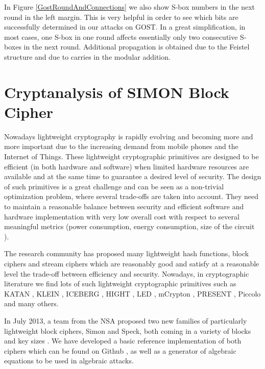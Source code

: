 In Figure \ref{GostRoundAndConnections}
we also show S-box numbers
in the next round in the left margin.
This is very helpful in order to see which bits are successfully determined in our attacks on GOST.
In a great simplification, in most cases, one S-box in one round affects essentially
only two consecutive S-boxes in the next round. Additional propagation is obtained due to the Feistel structure
and due to carries in the modular addition.



\section{Cryptanalysis of SIMON Block Cipher}
Nowadays lightweight cryptography is rapidly evolving and becoming more and more important due to the increasing demand from mobile phones and the Internet of Things. These lightweight cryptographic primitives are designed to
be efficient (in both hardware and software) when limited
hardware resources are available and at the same time to
guarantee a desired level of security. The
design of such primitives is a great challenge and can be
seen as a non-trivial optimization problem, where several
trade-offs are taken into account. They need to maintain
a reasonable balance between security and efficient software and hardware
implementation with very low overall cost with respect to several
meaningful metrics (power consumption, energy consumption, size of the circuit \cite{OptimiPaper,BoyarPeraltaMCMethod,BoyarPeraltaMCBoolean}).

The research community has
proposed many lightweight hash functions, block ciphers and stream ciphers which are
reasonably good and satisfy at a reasonable level the trade-off
between efficiency and security. Nowadays, in cryptographic
literature we find lots of such lightweight cryptographic primitives such as
KATAN \cite{KATAN}, KLEIN \cite{KLEIN}, ICEBERG
\cite{ICEBERG}, HIGHT \cite{HIGHT}, LED \cite{LED},
mCrypton \cite{mCrypton}, PRESENT \cite{PRESENT}, Piccolo \cite{Piccolo}
and many others.

In July 2013, a team from the NSA proposed two new families of particularly lightweight block
ciphers, Simon and Speck, both coming in a variety of blocks and key sizes
\cite{NSAciphers}. We have developed a basic reference implementation of both ciphers 
which can be found on Github \cite{simonref},
as well as a generator of algebraic equations to be used in algebraic attacks. 

